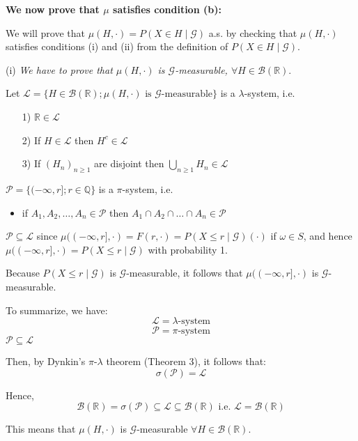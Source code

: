\textbf{We now prove that \(\mu\) satisfies condition (b):}

We will prove that \(\mu(H, \cdot) = P(X \in H \mid \mathcal{G})\) a.s. by checking that \(\mu(H, \cdot)\) satisfies conditions (i) and (ii) from the definition of \(P(X \in H \mid \mathcal{G})\).

(i) \textit{We have to prove that \(\mu(H, \cdot)\) is \(\mathcal{G}\)-measurable, \(\forall H \in \mathcal{B}(\mathbb{R})\)}.

Let \(\mathcal{L} = \{H \in \mathcal{B}(\mathbb{R}); \mu(H, \cdot) \text{ is } \mathcal{G}\text{-measurable}\}\) is a \(\lambda\)-system, i.e.
\begin{itemize}
    \item[1)] \(\mathbb{R} \in \mathcal{L}\)
    \item[2)] If \(H \in \mathcal{L}\) then \(H^c \in \mathcal{L}\)
    \item[3)] If \((H_n)_{n \geq 1}\) are disjoint then \(\bigcup_{n \geq 1} H_n \in \mathcal{L}\)
\end{itemize}
\(\mathcal{P} = \{(-\infty, r]; r \in \mathbb{Q}\}\) is a \(\pi\)-system, i.e.
\begin{itemize}
    \item if \(A_1, A_2, \ldots, A_n \in \mathcal{P}\) then \(A_1 \cap A_2 \cap \ldots \cap A_n \in \mathcal{P}\)
\end{itemize}

\(\mathcal{P} \subseteq \mathcal{L}\) since \(\mu((-\infty, r], \cdot) = F(r, \cdot) = P(X \leq r \mid \mathcal{G})(\cdot)\) if \(\omega \in S\), and hence \(\mu((-\infty, r], \cdot) = P(X \leq r \mid \mathcal{G})\) with probability 1.

Because \(P(X \leq r \mid \mathcal{G})\) is \(\mathcal{G}\)-measurable, it follows that \(\mu((-\infty, r], \cdot)\) is \(\mathcal{G}\)-measurable.

To summarize, we have:
\[
\mathcal{L} = \lambda\text{-system}
\]
\[
\mathcal{P} = \pi\text{-system}
\]
\(\mathcal{P} \subseteq \mathcal{L}\)

Then, by Dynkin's \(\pi\)-\(\lambda\) theorem (Theorem 3), it follows that:
\[
\sigma(\mathcal{P}) = \mathcal{L}
\]

Hence,
\[
\mathcal{B}(\mathbb{R}) = \sigma(\mathcal{P}) \subseteq \mathcal{L} \subseteq \mathcal{B}(\mathbb{R}) \text{ i.e. } \mathcal{L} = \mathcal{B}(\mathbb{R})
\]

This means that \(\mu(H, \cdot)\) is \(\mathcal{G}\)-measurable \(\forall H \in \mathcal{B}(\mathbb{R})\).

